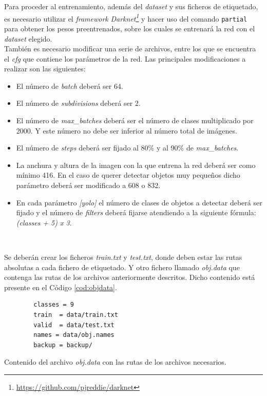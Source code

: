 Para proceder al entrenamiento, además del \textit{dataset} y sus ficheros de etiquetado, es necesario utilizar el \textit{framework} \textit{Darknet\footnote{\url{https://github.com/pjreddie/darknet}}} y hacer uso del comando \verb|partial| para obtener los pesos preentrenados, sobre los cuales se entrenará la red con el \textit{dataset} elegido.\\

También es necesario modificar una serie de archivos, entre los que se encuentra el \textit{cfg} que contiene los parámetros de la red. Las principales modificaciones a realizar son las siguientes:
\begin{itemize}
	\item El número de \textit{batch} deberá ser 64.
	\item El número de \textit{subdivisions} deberá ser 2.
	\item El número de \textit{max\_batches} deberá ser el número de clases multiplicado por 2000. Y este número no debe ser inferior al número total de imágenes.
	\item El número de \textit{steps} deberá ser fijado al 80\% y al 90\% de \textit{max\_batches}.
	\item La anchura y altura de la imagen con la que entrena la red deberá ser como mínimo 416. En el caso de querer detectar objetos muy pequeños dicho parámetro deberá ser modificado a 608 o 832.
	\item En cada parámetro \textit{[yolo]} el número de clases de objetos a detectar deberá ser fijado y el número de \textit{filters} deberá fijarse atendiendo a la siguiente fórmula: \textit{(classes + 5) x 3}.
\end{itemize}\

Se deberán crear los ficheros \textit{train.txt} y \textit{test.txt}, donde deben estar las rutas absolutas a cada fichero de etiquetado. Y otro fichero llamado \textit{obj.data} que contenga las rutas de los archivos anteriormente descritos. Dicho contenido está presente en el Código \ref{cod:objdata}.\\

\begin{code}[h]
	\begin{lstlisting}
		classes = 9
		train  = data/train.txt
		valid  = data/test.txt
		names = data/obj.names
		backup = backup/
	\end{lstlisting}
	\caption[Contenido del archivo \textit{obj.data} con las rutas de los archivos necesarios.]{Contenido del archivo \textit{obj.data} con las rutas de los archivos necesarios.}
	\label{cod:objdata}
\end{code}

